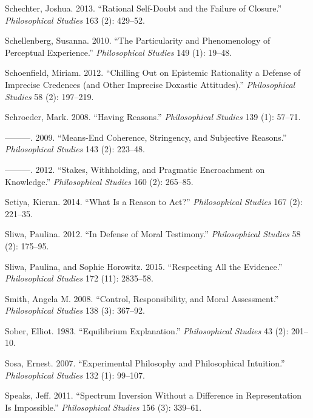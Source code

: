 \documentclass[
  10pt,
  letterpaper,
  DIV=11,
  numbers=noendperiod,
  twoside]{scrartcl}
\newlength{\cslhangindent}
\newenvironment{CSLReferences}[2] %
 {\begin{list}{}{%
  \setlength{\itemindent}{0pt}
  \setlength{\leftmargin}{0pt}
  \setlength{\parsep}{0pt}
  \ifodd #1
   \setlength{\leftmargin}{\cslhangindent}
   \setlength{\itemindent}{-1\cslhangindent}
  \fi
  \setlength{\itemsep}{#2\baselineskip}}}
 {\end{list}}
\begin{document}
\begin{CSLReferences}{1}{0}
Schechter, Joshua. 2013. {``Rational Self-Doubt and the Failure of
Closure.''} \emph{Philosophical Studies} 163 (2): 429--52.

Schellenberg, Susanna. 2010. {``The Particularity and Phenomenology of
Perceptual Experience.''} \emph{Philosophical Studies} 149 (1): 19--48.

Schoenfield, Miriam. 2012. {``Chilling Out on Epistemic Rationality a
Defense of Imprecise Credences (and Other Imprecise Doxastic
Attitudes).''} \emph{Philosophical Studies} 58 (2): 197--219.

Schroeder, Mark. 2008. {``Having Reasons.''} \emph{Philosophical
Studies} 139 (1): 57--71.

---------. 2009. {``Means-End Coherence, Stringency, and Subjective
Reasons.''} \emph{Philosophical Studies} 143 (2): 223--48.

---------. 2012. {``Stakes, Withholding, and Pragmatic Encroachment on
Knowledge.''} \emph{Philosophical Studies} 160 (2): 265--85.

Setiya, Kieran. 2014. {``What Is a Reason to Act?''} \emph{Philosophical
Studies} 167 (2): 221--35.

Sliwa, Paulina. 2012. {``In Defense of Moral Testimony.''}
\emph{Philosophical Studies} 58 (2): 175--95.

Sliwa, Paulina, and Sophie Horowitz. 2015. {``Respecting All the
Evidence.''} \emph{Philosophical Studies} 172 (11): 2835--58.

Smith, Angela M. 2008. {``Control, Responsibility, and Moral
Assessment.''} \emph{Philosophical Studies} 138 (3): 367--92.

Sober, Elliot. 1983. {``Equilibrium Explanation.''} \emph{Philosophical
Studies} 43 (2): 201--10.

Sosa, Ernest. 2007. {``Experimental Philosophy and Philosophical
Intuition.''} \emph{Philosophical Studies} 132 (1): 99--107.

Speaks, Jeff. 2011. {``Spectrum Inversion Without a Difference in
Representation Is Impossible.''} \emph{Philosophical Studies} 156 (3):
339--61.


\end{CSLReferences}
\end{document}
